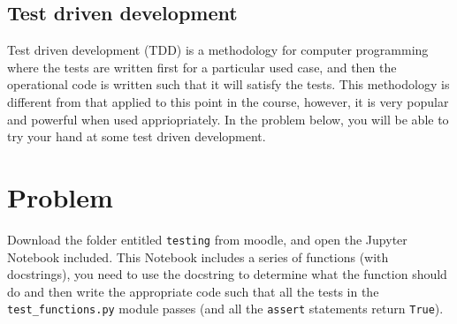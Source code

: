 \documentclass[a4paper]{article}
\begin{document}
\vspace{\baselineskip}
\begin{center}
	\noindent{}
\end{center}

\subsection{Test driven development}
Test driven development (TDD) is a methodology for computer programming where the tests are written first for a particular used case, and then the operational code is written such that it will satisfy the tests.
This methodology is different from that applied to this point in the course, however, it is very popular and powerful when used appriopriately.
In the problem below, you will be able to try your hand at some test driven development.

\section{Problem}
Download the folder entitled \texttt{testing} from moodle, and open the Jupyter Notebook included.
This Notebook includes a series of functions (with docstrings), you need to use the docstring to determine what the function should do and then write the appropriate code such that all the tests in the \texttt{test\_functions.py} module passes (and all the \texttt{assert} statements return \texttt{True}).

%
%
\end{document}
